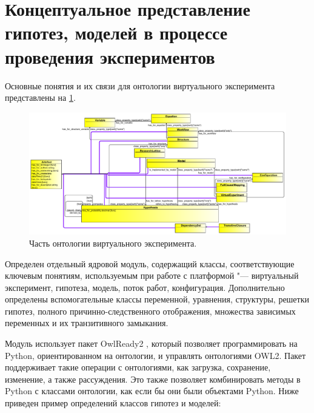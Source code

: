 \section{Концептуальное представление гипотез, моделей в процессе проведения экспериментов} \label{sect2_4}

Основные понятия и их связи для онтологии виртуального эксперимента представлены на \cref{fig:ve_schema}.

\begin{figure}[h!]
    \centering
    \includegraphics[width=\linewidth]{images/ve_schema2.pdf}
    \caption{Часть онтологии виртуального эксперимента.}\label{fig:ve_schema}
\end{figure}

Определен отдельный ядровой модуль, содержащий классы, соответствующие ключевым понятиям, используемым при работе 
с платформой "--- виртуальный эксперимент, гипотеза, модель, поток работ, конфигурация. Дополнительно определены 
вспомогательные классы переменной, уравнения, структуры, решетки гипотез, полного причинно-следственного отображения, 
множества зависимых переменных и их транзитивного замыкания. 

Модуль использует пакет OwlReady2 \cite{Lamy2017}, который позволяет программировать на Python, ориентированном на 
онтологии, и управлять онтологиями OWL2. Пакет поддерживает такие операции с онтологиями, как загрузка, сохранение, 
изменение, а также рассуждения. Это также позволяет комбинировать методы в Python с классами онтологии, как если бы 
они были объектами Python. Ниже приведен пример определений классов гипотез и моделей:

